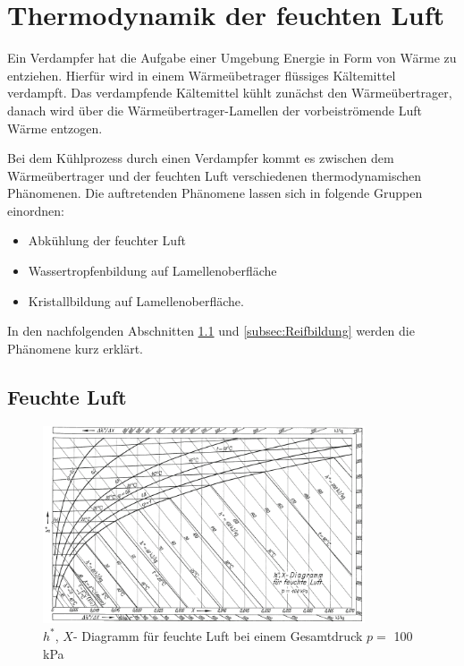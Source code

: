 \section{Thermodynamik der feuchten Luft}
\label{sec:Thermodynamik der feuchten Luft}

Ein Verdampfer hat die Aufgabe einer Umgebung Energie in Form von Wärme zu entziehen. Hierfür wird in einem Wärmeübetrager flüssiges Kältemittel verdampft. Das verdampfende Kältemittel kühlt zunächst den Wärmeübertrager, danach wird über die Wärmeübertrager-Lamellen der vorbeiströmende Luft Wärme entzogen. 

Bei dem Kühlprozess durch einen Verdampfer kommt es zwischen dem Wärmeübertrager und der feuchten Luft verschiedenen thermodynamischen Phänomenen. Die auftretenden Phänomene lassen sich in folgende Gruppen einordnen:

\begin{itemize}
\item	Abkühlung der feuchter Luft 
\item 	Wassertropfenbildung auf Lamellenoberfläche 
\item	Kristallbildung auf Lamellenoberfläche.
\end{itemize}

In den nachfolgenden Abschnitten \ref{subsec:Feuchte Luft} und \ref{subsec:Reifbildung} werden die Phänomene kurz erklärt.

\subsection{Feuchte Luft}
\label{subsec:Feuchte Luft}

\begin{figure}[htb]
\centering		\includegraphics[width=0.85\textwidth]{Pictures/h_x_Diagramm_Beahr.png}
\caption{$h^*$, $X$- Diagramm für feuchte Luft bei einem Gesamtdruck $p= $ 100 kPa \citep{Baehr2013}}
\label{fig:h_x_diagramm}
\end{figure}


